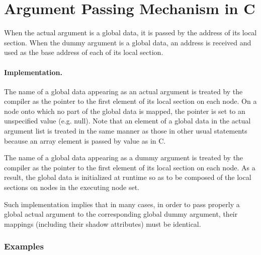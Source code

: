 \section{Argument Passing Mechanism in {\XMP} C}

When the actual argument is a global data, it is passed by the address
of its local section.
%
When the dummy argument is a global data, an address is received and
used as the base address of each of its local section.


\paragraph{Implementation.}

The name of a global data appearing as an actual argument is
treated by the {\XMP} compiler as the pointer to the first element of
its local section on each node.
%
On a node onto which no part of the global data is mapped, the pointer
is set to an unspecified value (e.g. null).
%
Note that an element of a global data in the actual argument list is
treated in the same manner as those in other usual statements because an
array element is passed by value as in C.

The name of a global data appearing as a dummy argument is
treated by the {\XMP} compiler as the pointer to the first element of
its local section on each node.
%
As a result, the global data is initialized at runtime so as to be
composed of the local sections on nodes in the executing node set.

Such implementation implies that in many cases, in order to pass
properly a global actual argument to the corresponding global dummy 
argument, their mappings (including their shadow attributes) must be
identical.

\subsubsection*{Examples}

